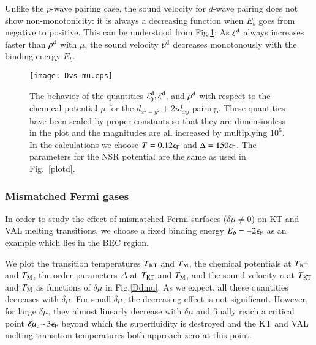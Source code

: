 \documentclass[aps,prd,amsmath,two column,nofootinbib,amssymb,referee]{revtex4}
\begin{document}
Unlike the $p$-wave pairing case, the sound velocity for $d$-wave pairing does not show non-monotonicity: it is always a decreasing function when $E_b$ goes from negative to positive. This can be understood from Fig.\ref{Dvs}: As $\zeta^{\rm d}$ always increases faster than $\rho^{\rm d}$ with $\mu$, the sound velocity $\upsilon^{\rm d}$ decreases monotonously with the binding energy $E_b$.

\begin{figure}[!htb]
\centering
\texttt{[image: Dvs-mu.eps]}
\caption{The behavior of the quantities $\zeta_0^{\rm d},\zeta^{\rm d}$, and $\rho^{\rm d}$ with respect to the chemical potential $\mu$ for the $d_{x^2-y^2}+2id_{xy}$ pairing. These quantities have been scaled by proper constants so that they are dimensionless in the plot and the magnitudes are all increased by multiplying $10^6$. In the calculations we choose  $T=0.12\epsilon_{\rm F}$ and $\Delta=150\epsilon_{\rm F}$. The parameters for the NSR potential are the same as used in Fig.~\ref{plotd}.}\label{Dvs}
\end{figure}


\subsubsection{Mismatched Fermi gases}\label{sectiond4}
In order to study the effect of mismatched Fermi surfaces ($\delta\mu\neq0$) on KT and VAL melting transitions, we choose a fixed binding energy $E_b=-2\epsilon_{\rm F}$ as an example which lies in the BEC region.

We plot the transition temperatures $T_{\rm KT}$ and $T_{\rm M}$, the chemical potentials at $T_{\rm KT}$ and $T_{\rm M}$, the order parameters $\Delta$ at $T_{\rm KT}$ and $T_{\rm M}$, and the sound velocity $\upsilon$  at $T_{\rm KT}$ and $T_{\rm M}$ as functions of $\delta\mu$ in Fig.\ref{Ddmu}. As we expect, all these quantities decreases with $\delta\mu$. For small $\delta\mu$, the decreasing effect is not significant. However, for large $\delta\mu$, they almost linearly decrease with $\delta\mu$ and finally reach a critical point $\delta\mu_c\!\sim\!3\epsilon_{\rm F}$ beyond which the superfluidity is destroyed and the KT and VAL melting transition temperatures both approach zero at this point.
\end{document}
